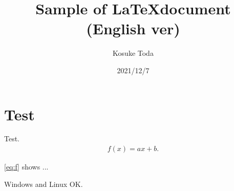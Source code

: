 \documentclass{article}
\begin{document}
    \title{Sample of \LaTeX document (English ver)}
    \author{Kosuke Toda}
    \date{2021/12/7}
    \maketitle

    \section{Test}
    Test.
    \begin{align}
        f(x) = ax + b. \label{eq:f}
    \end{align}
    
    \eqref{eq:f} shows ... 

    Windows and Linux OK.
\end{document}
